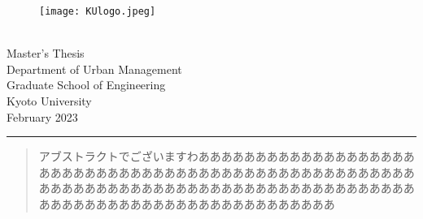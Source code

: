 \documentclass[11pt,a4paper,uplatex,onecolumn,dvipdfmx]{jsreport}
\begin{document}


\begin{titlepage}
    \vspace{15mm}
    \begin{wrapfigure}{r}{0.45\linewidth}  %
        \centering
        \vspace{5mm}\hspace{25mm}
        \texttt{[image: KUlogo.jpeg]}
    \end{wrapfigure}
    \leavevmode
    \par
    {
    \fontsize{12truept}{12truept}\selectfont
    \\
    Master's Thesis\\
    Department of Urban Management\\
    Graduate School of Engineering\\
    Kyoto University\\
    February 2023\\
    }
    \hrule
    \vspace{25mm}
    {
    \fontsize{16truept}{36truept}\selectfont
    }
\end{titlepage}


\begin{abstract}
    アブストラクトでございますわあああああああああああああああああああああああああああああああああああああああああああああああああああああああああああああああああああああああああああああああああああああああああああああああああああああああああああああああ
\end{abstract}
\end{document}
